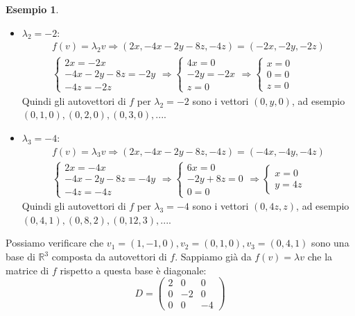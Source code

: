 \documentclass[a4paper]{article}
\theoremstyle{definition}
\newtheorem*{es}{Esempio}
\begin{document}
\begin{es}
\begin{itemize}
\begin{align*}
\begin{cases}
						z = 0
					\end{cases}
				\end{align*}
				Quindi gli autovettori di $f$ per $\lambda_1 = 2$ sono i vettori $(x, -x, 0)$, ad esempio $(1, -1, 0), (2, -2, 0), (3, -3, 0), ...$.
			\item $\lambda_2 = -2$: 
				\begin{align*}
					f(v) = \lambda_2 v \Rightarrow (2x, -4x - 2y - 8z, -4z) = (-2x, -2y, -2z) \\
					\begin{cases}
						2x = -2x \\
						-4x - 2y - 8z = -2y \\
						-4z = -2z
					\end{cases} \Rightarrow \begin{cases}
						4x = 0 \\
						 -2 y = - 2x \\
						z = 0
					\end{cases} \Rightarrow \begin{cases}
						x = 0 \\
						0 = 0 \\
						z = 0
					\end{cases}
				\end{align*}
				Quindi gli autovettori di $f$ per $\lambda_2 = -2$ sono i vettori $(0, y, 0)$, ad esempio $(0, 1, 0), (0, 2, 0), (0, 3, 0), ...$.
			\item $\lambda_3 = -4$:
				\begin{align*}
					f(v) = \lambda_3 v \Rightarrow (2x, -4x - 2y - 8z, -4z) = (-4x, -4y, -4z) \\
					\begin{cases}
						2x = -4x \\
						-4x - 2y - 8z = -4y \\
						-4z = -4z
					\end{cases} \Rightarrow \begin{cases}
						6x = 0 \\
						-2y + 8z = 0 \\
						0 = 0
					\end{cases} \Rightarrow \begin{cases}
						x = 0 \\
						y = 4z
					\end{cases}
				\end{align*}
				Quindi gli autovettori di $f$ per $\lambda_3 = -4$ sono i vettori $(0, 4z, z)$, ad esempio $(0, 4, 1), (0, 8, 2), (0, 12, 3), ...$.
		\end{itemize}
		Possiamo verificare che $v_1 = (1, -1, 0), v_2 = (0, 1, 0), v_3 = (0, 4, 1)$ sono una base di $\mathbb{R}^3$ composta da autovettori di $f$.
		Sappiamo già da $f(v) = \lambda v$ che la matrice di $f$ rispetto a questa base è diagonale:
		\begin{equation*}
			D = \begin{pmatrix}
				2 & 0 & 0 \\
				0 & -2 & 0 \\
				0 & 0 & -4
			\end{pmatrix}
		\end{equation*}
	\end{es}
\end{document}
